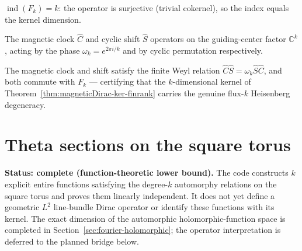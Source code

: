 \begin{theorem}
  \label{thm:fredholmIndex-magneticDirac}
  \leanok
  $\operatorname{ind}(F_k) = k$: the operator is surjective (trivial cokernel), so the index
  equals the kernel dimension.
\end{theorem}

\begin{definition}
  \label{def:magnetic-translations}
  \leanok
  The magnetic clock $\hat C$ and cyclic shift $\hat S$ operators on the guiding-center factor
  $\mathbb{C}^k$, acting by the phase $\omega_k = e^{2\pi i / k}$ and by cyclic permutation
  respectively.
\end{definition}

\begin{theorem}
  \label{thm:magnetic-translation-weyl}
  \leanok
  The magnetic clock and shift satisfy the finite Weyl relation $\hat C \hat S = \omega_k \hat
  S \hat C$, and both commute with $F_k$ — certifying that the $k$-dimensional kernel of
  Theorem~\ref{thm:magneticDirac-ker-finrank} carries the genuine flux-$k$ Heisenberg
  degeneracy.
\end{theorem}

\section{Theta sections on the square torus}
\label{sec:theta-sections}

\textbf{Status: complete (function-theoretic lower bound).}  The code constructs $k$ explicit
entire functions satisfying the degree-$k$ automorphy relations on the square torus and proves
them linearly independent.  It does not yet define a geometric $L^2$ line-bundle Dirac
operator or identify these functions with its kernel.  The exact dimension of the automorphic
holomorphic-function space is completed in Section~\ref{sec:fourier-holomorphic}; the operator
interpretation is deferred to the planned bridge below.

